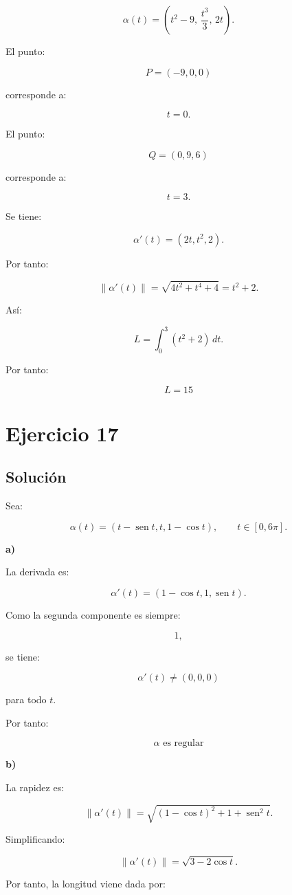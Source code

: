 \documentclass[11pt,a4paper]{article}
\newcommand{\sen}{\operatorname{sen}}
\begin{document}
\[
\alpha(t)
=
\left(
t^2-9,\,
\frac{t^3}{3},\,
2t
\right).
\]

El punto:

\[
P=(-9,0,0)
\]

corresponde a:

\[
t=0.
\]

El punto:

\[
Q=(0,9,6)
\]

corresponde a:

\[
t=3.
\]

Se tiene:

\[
\alpha'(t)
=
(2t,t^2,2).
\]

Por tanto:

\[
\|\alpha'(t)\|
=
\sqrt{
4t^2+t^4+4
}
=
t^2+2.
\]

Así:

\[
L
=
\int_0^3
(t^2+2)\,dt.
\]

Por tanto:

\[
\boxed{
L=15
}
\]

\section{Ejercicio 17}
\subsection{Solución}

Sea:

\[
\alpha(t)
=
(t-\sen t,t,1-\cos t),
\qquad
t\in[0,6\pi].
\]

\textbf{a)}

La derivada es:

\[
\alpha'(t)
=
(1-\cos t,1,\sen t).
\]

Como la segunda componente es siempre:

\[
1,
\]

se tiene:

\[
\alpha'(t)\neq(0,0,0)
\]

para todo \(t\).

Por tanto:

\[
\boxed{
\alpha\text{ es regular}
}
\]

\textbf{b)}

La rapidez es:

\[
\|\alpha'(t)\|
=
\sqrt{
(1-\cos t)^2+1+\sen^2t
}.
\]

Simplificando:

\[
\|\alpha'(t)\|
=
\sqrt{
3-2\cos t
}.
\]

Por tanto, la longitud viene dada por:
\end{document}

